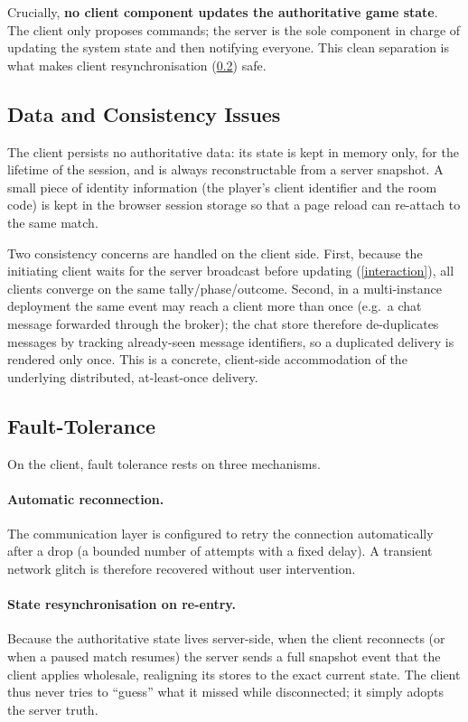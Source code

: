 \documentclass{scrartcl}
\begin{document}
Crucially, \textbf{no client component updates the authoritative game
state}. The client only proposes commands; the server is the sole
component in charge of updating the system state and then notifying
everyone. This clean separation is what makes client resynchronisation
(\cref{fault-tolerance}) safe.

\subsection{Data and Consistency Issues}\label{data-and-consistency-issues}

The client persists no authoritative data: its state is kept in memory
only, for the lifetime of the session, and is always reconstructable
from a server snapshot. A small piece of identity information (the
player's client identifier and the room code) is kept in the browser
session storage so that a page reload can re-attach to the same match.

Two consistency concerns are handled on the client side. First, because
the initiating client waits for the server broadcast before updating
(\cref{interaction}), all clients converge on the same tally/phase/outcome.
Second, in a multi-instance deployment the same event may reach a client
more than once (e.g.\ a chat message forwarded through the broker); the
chat store therefore de-duplicates messages by tracking already-seen
message identifiers, so a duplicated delivery is rendered only once.
This is a concrete, client-side accommodation of the underlying
distributed, at-least-once delivery.

\subsection{Fault-Tolerance}\label{fault-tolerance}

On the client, fault tolerance rests on three mechanisms.

\paragraph{Automatic reconnection.} The communication layer is
configured to retry the connection automatically after a drop (a
bounded number of attempts with a fixed delay). A transient network
glitch is therefore recovered without user intervention.

\paragraph{State resynchronisation on re-entry.} Because the
authoritative state lives server-side, when the client reconnects (or
when a paused match resumes) the server sends a full snapshot event that
the client applies wholesale, realigning its stores to the exact current
state. The client thus never tries to ``guess'' what it missed while
disconnected; it simply adopts the server truth.
\end{document}
